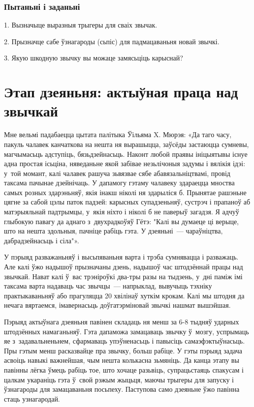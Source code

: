 \subsubsection{Пытаньні і заданьні}

1. Вызначыце выразныя трыгеры для сваіх звычак.

2. Прызначце сабе ўзнагароды (сьпіс) для падмацаваньня новай звычкі.

3. Якую шкодную звычку вы можаце замясьціць карыснай?


\section{Этап дзеяньня: актыўная праца над звычкай}

Мне вельмі падабаецца цытата палітыка Ўільяма X. Мюрэя: «Да таго часу, пакуль чалавек канчаткова на нешта ня вырашыцца, заўсёды застаюцца сумневы, магчымасьць адступіць, бязьдзейнасьць. Наконт любой праявы ініцыятывы існуе адна простая ісьціна, няведаньне якой забівае незьлічоныя задумы і вялікія ідэі: у~той момант, калі чалавек рашуча зьвязвае сябе абавязальніцтвамі, провід таксама пачынае дзейнічаць. У дапамогу гэтаму чалавеку здараецца мноства самых розных здарэньняў, якія інакш ніколі ня здарыліся б. Прынятае рашэньне цягне за сабой цэлы паток падзей: карысных супадзеньняў, сустрэч і прапаноў аб матэрыяльнай падтрымцы, у~якія ніхто і ніколі б не паверыў загадзя. Я адчуў глыбокую павагу да аднаго з~двухрадкоўяў Гётэ: "Калі вы думаеце ці верыце, што на нешта здольныя, пачніце рабіць гэта. У дзеяньні~--- чараўніцтва, дабрадзейнасьць і сіла"».

У пэрыяд разважаньняў і высьпяваньня варта і трэба сумнявацца і разважаць. Але калі ўжо надышоў прызначаны дзень, надышоў час штодзённай працы над звычкай. Нават калі ў~вас трэніроўкі два-тры разы на тыдзень, у~дні паміж імі таксама варта надаваць час звычцы~--- напрыклад, вывучыць тэхніку практыкаваньняў або прагуляцца 20 хвілінаў хуткім крокам. Калі мы штодня да нечага вяртаемся, імавернасьць доўгатэрміновай звычкі нашмат вышэйшая.

Пэрыяд актыўнага дзеяньня павінен складаць ня менш за 6-8 тыдняў ударных штодзённых намаганьняў. Гэта дапаможа замацаваць звычку ў~мозгу, успрымаць яе з~задавальненьнем, сфармаваць упэўненасьць і павысіць самаэфэктыўнасьць. Пры гэтым менш расказвайце пра звычку, больш рабіце. У гэты пэрыяд задача асвоіць навыкі важнейшая, чым нешта колькасна зьмяніць. Да канца этапу вы павінны лёгка ўмець рабіць тое, што хочаце разьвіць, супрацьстаяць спакусам і цалкам укараніць гэта ў~свой рэжым жыцьця, маючы трыгеры для запуску і ўзнагароды для замацаваньня посьпеху. Паступова само дзеяньне ўжо павінна стаць узнагародай.

